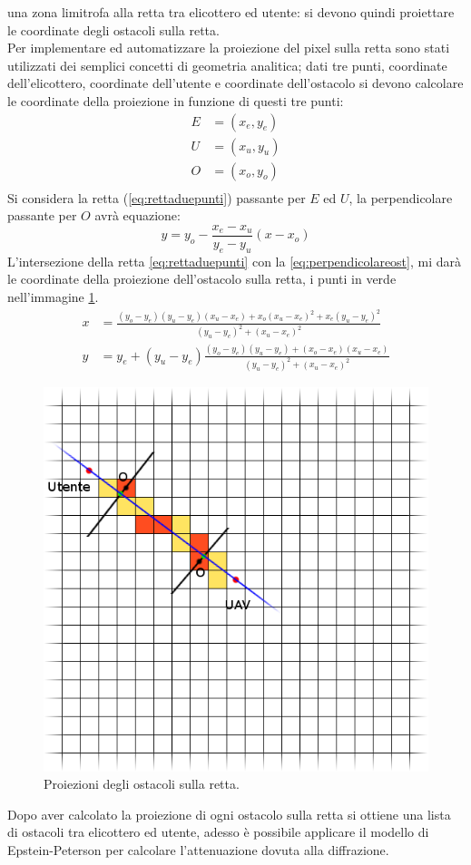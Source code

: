 una zona limitrofa alla retta tra elicottero ed utente: si devono quindi proiettare le coordinate degli ostacoli sulla retta. \\
Per implementare ed automatizzare la proiezione del pixel sulla retta sono stati utilizzati dei semplici concetti di geometria analitica;
dati tre punti, coordinate dell'elicottero, coordinate dell'utente e coordinate dell'ostacolo si devono calcolare le coordinate della 
proiezione in funzione di questi tre punti:
\begin{align*}
E &= (x_{e},y_{e}) \\
U &= (x_{u},y_{u}) \\
O &= (x_{o},y_{o}) \\
\end{align*}
Si considera la retta (\ref{eq:rettaduepunti}) passante per $E$ ed $U$, la perpendicolare passante per $O$ avrà equazione:
\begin{equation}
y = y_{o} - \frac{x_{e}-x_{u}}{y_{e}-y_{u}}(x-x_{o})
\label{eq:perpendicolareost}
\end{equation}
L'intersezione della retta \ref{eq:rettaduepunti} con la \ref{eq:perpendicolareost}, mi darà le coordinate della proiezione dell'ostacolo
sulla retta, i punti in verde nell'immagine \ref{img:proiezioni}.
\begin{align*}
x &= \frac{(y_{o}-y_{e}) (y_{u}-y_{e}) (x_{u}-x_{e}) + x_{o} (x_{u}-x_{e})^{2} + x_{e} (y_{u}-y_{e})^{2}}
	  {(y_{u}-y_{e})^{2} + (x_{u}-x_{e})^{2}} \\
y &= y_{e} + (y_{u}-y_{e}) \frac{(y_{o}-y_{e}) (y_{u}-y_{e}) + (x_{o}-x_{e}) (x_{u}-x_{e})}
			        {(y_{u}-y_{e})^{2} + (x_{u}-x_{e})^{2}}
\end{align*}
\begin{figure}[h]
\centering
\includegraphics[height=0.7\textwidth]{Immagini/proiezioni}
\caption{Proiezioni degli ostacoli sulla retta.}
\label{img:proiezioni}
\end{figure}
Dopo aver calcolato la proiezione di ogni ostacolo sulla retta si ottiene una lista di ostacoli tra elicottero ed utente, adesso è possibile
applicare il modello di Epstein-Peterson per calcolare l'attenuazione dovuta alla diffrazione.

